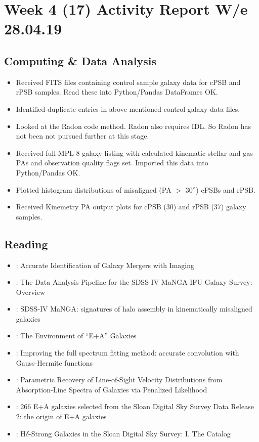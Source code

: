 \section{Week 4 (17) Activity Report W/e 28.04.19}

\subsection{Computing \& Data Analysis}
\begin{itemize}
    \item Received FITS files containing control sample galaxy data for cPSB and rPSB samples. Read these into Python/Pandas DataFrames OK.    
    \item Identified duplicate entries in above mentioned control galaxy data files.
    \item Looked at the Radon code method. Radon also requires IDL. So Radon has not been not pursued further at this stage.
    \item Received full MPL-8 galaxy listing with calculated kinematic stellar and gas PAs and observation quality flags set. Imported this data into Python/Pandas OK.
    \item {Plotted histogram distributions of misaligned (PA $>$ 30$\degree$) cPSBs and rPSB.}
    \item Received Kinemetry PA output plots for cPSB (30) and rPSB (37) galaxy samples.

\end{itemize}
\subsection{Reading}
\begin{itemize}
    \item \citet{2019ApJ...872...76N} : {Accurate Identification of Galaxy Mergers with Imaging}
    \item \citet{2019arXiv190100856W} : {The Data Analysis Pipeline for the SDSS-IV MaNGA IFU Galaxy Survey: Overview}
    \item \citet{2019MNRAS.483..172D} : {SDSS-IV MaNGA: signatures of halo assembly in kinematically misaligned galaxies}
    \item \citet{1996ApJ...466..104Z} : {The Environment of ``E+A'' Galaxies} 
    \item \citet{2017MNRAS.466..798C} : {Improving the full spectrum fitting method: accurate convolution with Gauss-Hermite functions}
    \item \citet{2004PASP..116..138C} : {Parametric Recovery of Line-of-Sight Velocity Distributions from Absorption-Line Spectra of Galaxies via Penalized Likelihood}
    \item \citet{2005MNRAS.357..937G} : {266 E+A galaxies selected from the Sloan Digital Sky Survey Data Release 2: the origin of E+A galaxies}
    \item \citet{10.1093/pasj/55.4.771} : {H$\delta$-Strong Galaxies in the Sloan Digital Sky Survey: I. The Catalog}
\end{itemize}